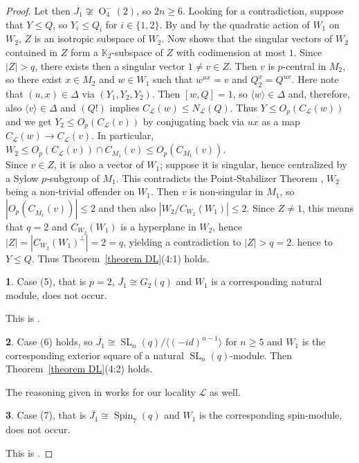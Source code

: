 \documentclass{amsart}
\numberwithin{equation}{section}
\theoremstyle{definition}
\theoremstyle{subresult}
\theoremstyle{caseresult}
\newtheorem{caseresult}{}[equation]
\newcommand{\bK}{\mathbb{K}}
\renewcommand{\L}{\mathcal{L}}
\newcommand{\SL}{\operatorname{SL}}
\newcommand{\Spin}{\operatorname{Spin}}
\renewcommand{\O}{\operatorname{O}}
\newcommand{\ov}{\overline}
\newcommand{\fto}{\longrightarrow}
\newcommand{\<}{\langle}
\renewcommand{\>}{\rangle}
\begin{document}
\begin{proof}
	Let then $\ov{J_1} \not \cong \O_4^-(2)$, so $2n \ge 6$. Looking for a contradiction, suppose that $Y \le Q$, so $Y_i \le Q_i$ for $i \in \{1,2\}$. By \cite[Lemma B.6(e)]{Meier-Stell-Stroth:2012} and by the quadratic action of $W_1$ on $W_2$, $Z$ is an isotropic subspace of $W_2$. Now \cite[Lemma B.5]{Meier-Stell-Stroth:2012} shows that the singular vectors of $W_2$ contained in $Z$ form a $\bK_2$-subspace of $Z$ with codimension at most $1$. Since $|Z| > q$, there exists then a singular vector $1 \ne v \in Z$. Then $v$ is $p$-central in $M_2$, so there exist $x \in M_2$ and $w \in W_1$ such that $w^{ux} =v$ and $Q_2^x = Q^{ux}$. Here note that $(u,x) \in \Delta$ via $(Y_1,Y_2,Y_2)$. Then $[w,Q]=1$, so $\<w\> \in \Delta$ and, therefore, also $\<v\> \in \Delta$ and $(Q!)$ implies $C_\L(w) \le N_\L(Q)$. Thus $Y \le O_p(C_\L(w))$ and we get $Y_2 \le O_p(C_\L(v))$ by conjugating back via $ux$ as a map $C_\L(w) \fto C_\L(v)$. In particular, $W_2 \le O_p(C_\L(v)) \cap C_{M_1}(v) \le O_p(C_{M_1}(v))$.\\
	Since $v \in Z$, it is also a vector of $W_1$; suppose it is singular, hence centralized by a Sylow $p$-subgroup of $M_1$. This contradicts the Point-Stabilizer Theorem \cite[Theorem C.8]{Meier-Stell-Stroth:2012}, $W_2$ being a non-trivial offender on $W_1$. Then $v$ is non-singular in $M_1$, so $|O_p(C_{\ov{M_1}}(v))| \le 2$ and then also $|W_2 / C_{W_2}(W_1)| \le 2$. Since $Z \ne 1$, this means that $q=2$ and $C_{W_2}(W_1)$ is a hyperplane in $W_2$, hence $|Z| = |C_{W_2}(W_1)^\perp| =2 = q$, yielding a contradiction to $|Z| > q=2$. hence to $Y \le Q$. Thus Theorem~\ref{theorem DL}(4:1) holds.
	
	\begin{caseresult}
		Case (5), that is $p=2$, $\ov{J_1}\cong G_2(q)$ and $W_1$ is a corresponding natural module, does not occur.
	\end{caseresult}
	This is \cite[Lemma 4.14, Case 5]{Meier-Stell-Stroth:2012}.
	
	\begin{caseresult}
		Case (6) holds, so $\ov{J_1} \cong \SL_n(q) / \<(-id)^{n-1}\>$ for $n \ge 5$ and $W_1$ is the corresponding exterior square of a natural $\SL_n(q)$-module. Then Theorem~\ref{theorem DL}(4:2) holds.
	\end{caseresult}
	The reasoning given in \cite[Lemma 4.14, Case 6]{Meier-Stell-Stroth:2012} works for our locality $\L$ as well.
	
	\begin{caseresult}
		Case (7), that is $\ov{J_1} \cong \Spin_{7}(q)$ and $W_1$ is the corresponding spin-module, does not occur.
	\end{caseresult}
	This is \cite[Lemma 4.14, Case 7]{Meier-Stell-Stroth:2012}.
	

\end{proof}
\end{document}
